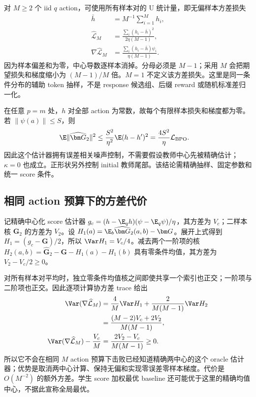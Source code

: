 对 $M\ge2$ 个 iid $q$ action，可使用所有样本对的 U 统计量，即无偏样本方差损失
\begin{align}
 \bar h&=M^{-1}\sum_{i=1}^Mh_i,\\
 \widehat{\mathcal L}_M
 &=\frac{\sum_i(h_i-\bar h)^2}{2\eta(M-1)},\\
 \nabla\widehat{\mathcal L}_M
 &=\frac{\sum_i(h_i-\bar h)\psi_i}{\eta(M-1)}.
 \label{eq:center-free-sample-variance-bpo}
\end{align}
因为样本偏差和为零，中心导数逐样本消掉。分母必须是 $M-1$；采用 $M$ 会把期望损失和梯度缩小为 $(M-1)/M$ 倍。$M=1$ 不定义该方差损失。这里是同一条件分布的辅助 token 抽样，不是 response 候选组、后缀 reward 或随机标准差归一化。

在任意 $p=m$ 处，$h$ 对全部 action 为常数，故每个有限样本损失和梯度都为零。若 $\|\psi(a)\|\le S$，则
\begin{align}
 \E\|\widehat{\bm G}_2\|^2
 &\le\frac{S^2}{\eta^2}\E(h-h')^2
 =\frac{4S^2}{\eta}\mathcal L_{\mathrm{BPO}}.
\end{align}
因此这个估计器拥有误差相关噪声控制，不需要假设教师中心先被精确估计；$\kappa=0$ 也成立。正形状另外控制 initial 教师尾部。该结论需精确抽样、固定参数和统一 score 条件。
\subsection{相同 action 预算下的方差代价}

记精确中心化 score 估计器 $g_c=(h-\E_qh)(\psi-\E_q\psi)/\eta$，其方差为 $V_c$；二样本核 $\widehat{\bm G}_2$ 的方差为 $V_2$。设 $H_1(a)=\E_b\widehat{\bm G}_2(a,b)-\bm G$。展开上式得到 $H_1=(g_c-\bm G)/2$，所以 $\Var H_1=V_c/4$。减去两个一阶项的核 $H_2(a,b)=\widehat{\bm G}_2-\bm G-H_1(a)-H_1(b)$ 具有零条件均值，其方差为 $V_2-V_c/2\ge0$。

对所有样本对平均时，独立零条件均值核之间即使共享一个索引也正交；一阶项与二阶项也正交。因此逐项计算协方差 trace 给出
\begin{align}
 \Var(\nabla\widehat{\mathcal L}_M)
 &=\frac{4}{M}\Var H_1+\frac{2}{M(M-1)}\Var H_2\\
 &=\frac{(M-2)V_c+2V_2}{M(M-1)},\\
 \Var(\nabla\widehat{\mathcal L}_M)-\frac{V_c}{M}
 &=\frac{2V_2-V_c}{M(M-1)}\ge0.
 \label{eq:center-free-variance-cost}
\end{align}
所以它不会在相同 $M$ action 预算下击败已经知道精确两中心的这个 oracle 估计器；优势是取消两中心计算、保持无偏和实现零误差零样本梯度。代价是 $O(M^{-2})$ 的额外方差。学生 score 加权最优 baseline 还可能优于这里的精确均值中心，不据此宣称全局最优。

